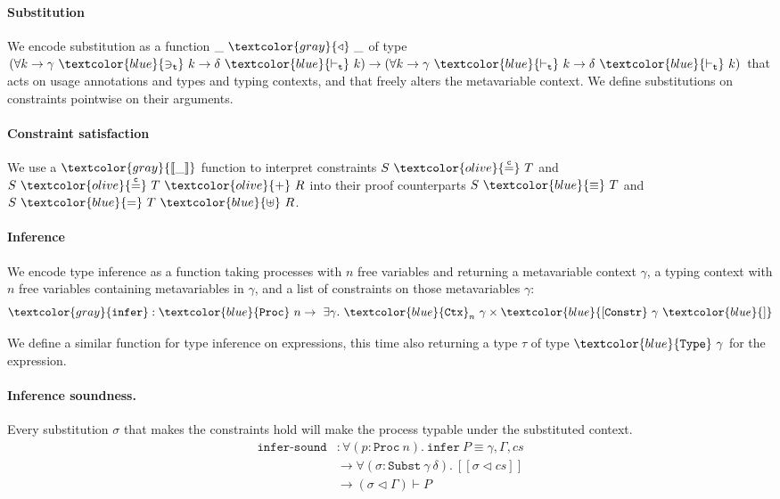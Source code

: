 \documentclass[sigplan,screen,review]{acmart}
\newcommand{\constr}[1]{\textcolor{olive}{\mathtt{#1}}}
\newcommand{\func}[1]{\textcolor{gray}{\mathtt{#1}}}
\newcommand{\type}[1]{\textcolor{blue}{\mathtt{#1}}}
\newcommand{\sProc}[1]{\type{Proc}~#1}
\newcommand{\tvar}[2]{#1 ~\type{\ni_t}~ #2}
\newcommand{\tkind}[2]{#1 ~\type{\vdash_t}~ #2}
\newcommand{\ttype}[1]{\type{Type}~#1}
\newcommand{\tCtx}[2]{\type{Ctx}_{#1}~#2}
\newcommand{\tSplit}[3]{#1~\type{=}~#2~\type{\uplus}~#3}
\newcommand{\tEq}[2]{#1~\type{\equiv}~#2}
\newcommand{\tConstrs}[1]{\type{[Constr} ~ #1 ~ \type{]}}
\newcommand{\subst}[2]{#1 ~ \func{\triangleleft} ~ #2}
\newcommand{\eqconstr}[2]{#1 ~ \constr{\stackrel{c}{=}} ~ #2}
\newcommand{\sumconstr}[3]{#1 ~ \constr{\stackrel{c}{=}} ~ #2 ~ \constr{+} ~ #3}
\begin{document}
\paragraph{Substitution}

We encode substitution as a function $\subst{\_}{\_}$ of type $(\forall k \to \tvar{\gamma}{k} \to \tkind{\delta}{k}) \to (\forall k \to \tkind{\gamma}{k} \to \tkind{\delta}{k})$ that acts on usage annotations and types and typing contexts, and that freely alters the metavariable context.
We define substitutions on constraints pointwise on their arguments.

\paragraph{Constraint satisfaction}

We use a $\func{[\![\_]\!]}$ function to interpret constraints $\eqconstr{S}{T}$ and $\sumconstr{S}{T}{R}$ into their proof counterparts $\tEq{S}{T}$ and $\tSplit{S}{T}{R}$.

\paragraph{Inference}

We encode type inference as a function taking processes with $n$ free variables and returning a metavariable context $\gamma$, a typing context with $n$ free variables containing metavariables in $\gamma$, and a list of constraints on those metavariables $\gamma$:
$$
\func{infer} : \sProc{n} \to ~ \exists \gamma. ~ \tCtx{n}{\gamma} \times \tConstrs{\gamma}
$$


We define a similar function for type inference on expressions, this time also returning a type $\tau$ of type $\ttype{\gamma}$ for the expression.


\paragraph{Inference soundness.}

Every substitution \(\sigma\) that makes the constraints hold will make
the process typable under the substituted context. \[
\begin{aligned}
\texttt{infer-sound} &: \forall (p : \texttt{Proc}~n). ~ \texttt{infer}~P \equiv \gamma , \Gamma , cs \\
&\to \forall (\sigma : \texttt{Subst}~\gamma~\delta). ~ [\![ \sigma \triangleleft cs ]\!] \\
&\to (\sigma \triangleleft \Gamma) \vdash P
\end{aligned}
\]
\end{document}
